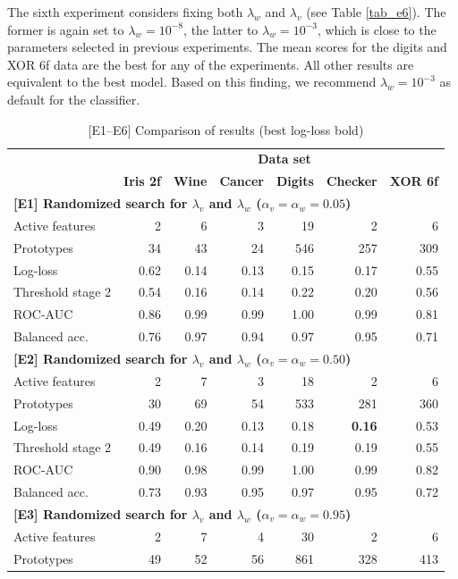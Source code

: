 %
The sixth experiment considers fixing both $\lambda_w$ and $\lambda_v$ (see Table \ref{tab_e6}).
The former is again set to $\lambda_w=10^{-8}$, the latter to $\lambda_w=10^{-3}$, which is close to the parameters selected in previous experiments.
The mean scores for the digits and XOR 6f data are the best for any of the experiments.
All other results are equivalent to the best model.
Based on this finding, we recommend $\lambda_w=10^{-3}$ as default for the classifier.\par
%
\begin{table}
\caption{[E1--E6] Comparison of results (best log-loss bold)}
\label{tab_e1_to_e6}
%
\begin{center}
\small
\begin{tabular}{|lrrrrrr|}
\hline
&\multicolumn{6}{c|}{\textbf{\hrulefill\ Data set \hrulefill}}\\
&\textbf{Iris 2f}&\textbf{Wine}&\textbf{Cancer}&\textbf{Digits}&\textbf{Checker}&\textbf{XOR 6f}\\
\multicolumn{7}{|l|}{\textbf{[E1] Randomized search for $\lambda_v$ and $\lambda_w$ ($\alpha_v=\alpha_w=0.05$)}}\\
Active features&2&6&3&19&2&6\\
Prototypes&34&43&24&546&257&309\\
Log-loss&0.62&0.14&0.13&0.15&0.17&0.55\\
Threshold stage 2&0.54&0.16&0.14&0.22&0.20&0.56\\
ROC-AUC&0.86&0.99&0.99&1.00&0.99&0.81\\
Balanced acc.&0.76&0.97&0.94&0.97&0.95&0.71\\
\multicolumn{7}{|l|}{\textbf{[E2] Randomized search for $\lambda_v$ and $\lambda_w$ ($\alpha_v=\alpha_w=0.50$)}}\\
Active features&2&7&3&18&2&6\\
Prototypes&30&69&54&533&281&360\\
Log-loss&0.49&0.20&0.13&0.18&\textbf{0.16}&0.53\\
Threshold stage 2&0.49&0.16&0.14&0.19&0.19&0.55\\
ROC-AUC&0.90&0.98&0.99&1.00&0.99&0.82\\
Balanced acc.&0.73&0.93&0.95&0.97&0.95&0.72\\
\multicolumn{7}{|l|}{\textbf{[E3] Randomized search for $\lambda_v$ and $\lambda_w$ ($\alpha_v=\alpha_w=0.95$)}}\\
Active features&2&7&4&30&2&6\\
Prototypes&49&52&56&861&328&413\\

\end{tabular}
\end{center}
\end{table}
